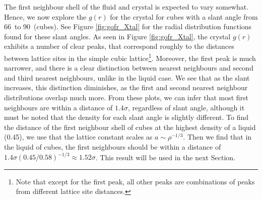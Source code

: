 \documentclass[thesis]{subfiles}
\begin{document}
The first neighbour shell of the fluid and crystal is expected to vary somewhat. Hence, we now explore the $g(r)$ for the crystal for cubes with a slant angle from 66\degr\ to 90\degr\ (cubes). See Figure \ref{fig:gofr_Xtal} for the radial distribution functions found for these slant angles. As seen in Figure \ref{fig:gofr_Xtal}, the crystal $g(r)$ exhibits a number of clear peaks, that correspond roughly to the distances between lattice sites in the simple cubic lattice\footnote{Note that except for the first peak, all other peaks are combinations of peaks from different lattice site distances.}. Moreover, the first peak is much narrower, and there is a clear distinction between nearest neighbours and second and third nearest neighbours, unlike in the liquid case. We see that as the slant increases, this distinction diminishes, as the first and second nearest neighbour distributions overlap much more. From these plots, we can infer that most first neighbours are within a distance of $1.4\sigma$, regardless of slant angle, although it must be noted that the density for each slant angle is slightly different. To find the distance of the first neighbour shell of cubes at the highest density of a liquid (0.45)\cite{van2017phase}, we use that the lattice constant scales as $a \sim \rho^{-1/3}$. Then we find that in the liquid of cubes, the first neighbours should be within a distance of $1.4\sigma (0.45/0.58)^{-1/3} \approx 1.52\sigma$. This result will be used in the next Section.
\end{document}
